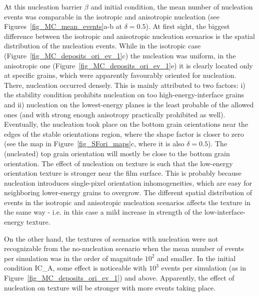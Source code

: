 At this nucleation barrier $\beta$ and initial condition, the mean number of nucleation events was comparable in the isotropic and anisotropic nucleation (see Figures~\ref{fig_MC_mean_events}a-b at $\delta=0.5$). At first sight, the biggest difference between the isotropic and anisotropic nucleation scenarios is the spatial distribution of the nucleation events. While in the isotropic case (Figure~\ref{fig_MC_deposits_ori_ev_1}c) the nucleation was uniform, in the anisotropic one (Figure~\ref{fig_MC_deposits_ori_ev_1}e) it is clearly located only at specific grains, which were apparently favourably oriented for nucleation. There, nucleation occurred densely. This is mainly attributed to two factors: i) the stability condition prohibits nucleation on too high-energy-interface grains and ii) nucleation on the lowest-energy planes is the least probable of the allowed ones (and with strong enough anisotropy practically prohibited as well). Eventually, the nucleation took place on the bottom grain orientations near the edges of the stable orientations region, where the shape factor is closer to zero (see the map in Figure~\ref{fig_SFori_maps}c, where it is also $\delta=0.5$). The (nucleated) top grain orientation will mostly be close to the bottom grain orientation. The effect of nucleation on texture is such that the low-energy orientation texture is stronger near the film surface. This is probably because nucleation introduces single-pixel orientation inhomogeneities, which are easy for neighboring lower-energy grains to overgrow. The different spatial distribution of events in the isotropic and anisotropic nucleation scenarios affects the texture in the same way - i.e. in this case a mild increase in strength of the low-interface-energy texture. 

On the other hand, the textures of scenarios with nucleation were not recognizable from the no-nucleation scenario when the mean number of events per simulation was in the order of magnitude $10^2$ and smaller. In the initial condition IC\_A, some effect is noticeable with $10^3$ events per simulation (as in Figure~\ref{fig_MC_deposits_ori_ev_1}) and above. Apparently, the effect of nucleation on texture will be stronger with more events taking place.   

